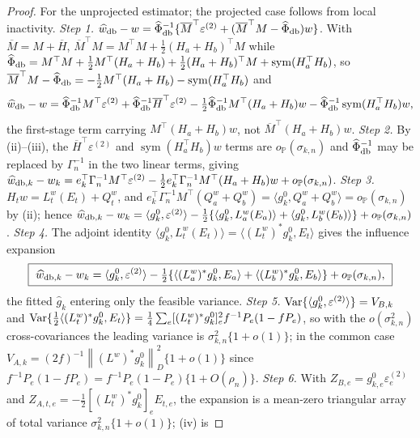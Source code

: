 \documentclass[12pt]{article}
\newcommand{\1}{\mathbf{1}}
\newcommand{\norm}[1]{\left\lVert#1\right\rVert}
\providecommand{\sym}{\operatorname{sym}}
\begin{document}
\begin{proof}
For the unprojected estimator; the projected case follows from local inactivity.
\emph{Step 1.} $\widehat w_{\rm db}-w=\widehat\Phi_{\rm db}^{-1}\{\overline
M^\top\varepsilon^{(2)}+(\overline M^\top M-\widehat\Phi_{\rm db})w\}$. With $\overline M=M+\overline
H$, $\overline M^\top M=M^\top M+\tfrac12(H_a+H_b)^\top M$ while $\widehat\Phi_{\rm db}=M^\top
M+\tfrac12M^\top(H_a+H_b)+\tfrac12(H_a+H_b)^\top M+\sym(H_a^\top H_b)$, so $\overline M^\top
M-\widehat\Phi_{\rm db}=-\tfrac12M^\top(H_a+H_b)-\sym(H_a^\top H_b)$ and
\[
        \widehat w_{\rm db}-w=\widehat\Phi_{\rm db}^{-1}M^\top\varepsilon^{(2)}+\widehat\Phi_{\rm
        db}^{-1}\overline H^\top\varepsilon^{(2)}-\tfrac12\widehat\Phi_{\rm db}^{-1}M^\top(H_a+H_b)w-\widehat\Phi_{\rm
        db}^{-1}\sym(H_a^\top H_b)w,
\]
the first-stage term carrying $M^\top(H_a+H_b)w$, not $\overline M^\top(H_a+H_b)w$.
\emph{Step 2.} By (ii)--(iii), the $\overline H^\top\varepsilon^{(2)}$ and $\sym(H_a^\top H_b)w$
terms are $o_{\mathbb P}(\sigma_{k,n})$ and $\widehat\Phi_{\rm db}^{-1}$ may be replaced by
$\Gamma_n^{-1}$ in the two linear terms, giving $\widehat w_{{\rm db},k}-w_k=e_k^\top\Gamma_n^{-1}M^\top\varepsilon^{(2)}-\tfrac12
e_k^\top\Gamma_n^{-1}M^\top(H_a+H_b)w+o_{\mathbb P}(\sigma_{k,n})$.
\emph{Step 3.} $H_tw=L_t^w(E_t)+Q_t^w$, and $e_k^\top\Gamma_n^{-1}M^\top(Q_a^w+Q_b^w)=\langle
g_k^0,Q_a^w+Q_b^w\rangle=o_{\mathbb P}(\sigma_{k,n})$ by (ii); hence $\widehat w_{{\rm
db},k}-w_k=\langle g_k^0,\varepsilon^{(2)}\rangle-\tfrac12\{\langle g_k^0,L_a^w(E_a)\rangle+\langle
g_k^0,L_b^w(E_b)\rangle\}+o_{\mathbb P}(\sigma_{k,n})$.
\emph{Step 4.} The adjoint identity $\langle g_k^0,L_t^w(E_t)\rangle=\langle(L_t^w)^*g_k^0,E_t\rangle$
gives the influence expansion
\[
\boxed{\ \widehat w_{{\rm db},k}-w_k=\langle g_k^0,\varepsilon^{(2)}\rangle-\tfrac12\{\langle(L_a^w)^*g_k^0,E_a\rangle+\langle(L_b^w)^*g_k^0,E_b\rangle\}+o_{\mathbb
P}(\sigma_{k,n}),\ }
\]
the fitted $\widehat g_k$ entering only the feasible variance.
\emph{Step 5.} ${\rm Var}\{\langle g_k^0,\varepsilon^{(2)}\rangle\}=V_{B,k}$ and ${\rm
Var}\{\tfrac12\langle(L_t^w)^*g_k^0,E_t\rangle\}=\tfrac14\sum_e[(L_t^w)^*g_k^0]_e^2f^{-1}P_e(1-fP_e)$,
so with the $o(\sigma_{k,n}^2)$ cross-covariances the leading variance is $\sigma_{k,n}^2\{1+o(1)\}$;
in the common case $V_{A,k}=(2f)^{-1}\norm{(L^w)^*g_k^0}_D^2\{1+o(1)\}$ since $f^{-1}P_e(1-fP_e)=f^{-1}P_e(1-P_e)\{1+O(\rho_n)\}$.
\emph{Step 6.} With $Z_{B,e}=g_{k,e}^0\varepsilon^{(2)}_e$ and $Z_{A,t,e}=-\tfrac12[(L_t^w)^*g_k^0]_eE_{t,e}$,
the expansion is a mean-zero triangular array of total variance $\sigma_{k,n}^2\{1+o(1)\}$; (iv) is

\end{proof}
\end{document}
